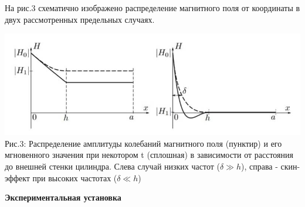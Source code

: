 \documentclass[a4paper,12pt]{report}
\begin{document}
На рис.3 схематично изображено распределение магнитного поля от координаты в двух рассмотренных предельных случаях.

\begin{center}
	\includegraphics[width= 1\textwidth]{рис3.jpg}\\
	\caption{Рис.3: Распределение амплитуды колебаний магнитного поля (пунктир) и его мгновенного значения при некотором t (сплошная) в зависимости от расстояния до внешней стенки цилиндра. Слева случай низких частот (\(\delta\gg h\)), справа - скин-эффект при высоких частотах (\(\delta\ll h\))}
\end{center}

\vspace{\baselineskip}
\noindent\textbf{Экспериментальная установка}
\end{document}
